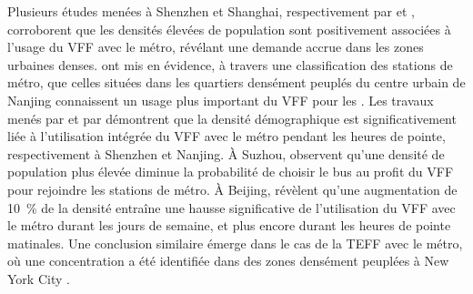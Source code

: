 \begin{refsegment}
Plusieurs études menées à Shenzhen et Shanghai, respectivement par \textcolor{blue}{\textcite[6]{wang_relationship_2020}} et \textcolor{blue}{\textcite[31]{lin_analysis_2019}}, corroborent que les densités élevées de population sont positivement associées à l'usage du \acrshort{VFF} avec le métro, révélant une demande accrue dans les zones urbaines denses. \textcolor{blue}{\textcite[16]{li_operating_2019}} ont mis en évidence, à travers une classification des stations de métro, que celles situées dans les quartiers densément peuplés du centre urbain de Nanjing connaissent un usage plus important du \acrshort{VFF} pour les . Les travaux menés par \textcolor{blue}{\textcite[25]{guo_dockless_2021}} et par \textcolor{blue}{\textcite[184]{cheng_exploring_2022}} démontrent que la densité démographique est significativement liée à l'utilisation intégrée du \acrshort{VFF} avec le métro pendant les heures de pointe, respectivement à Shenzhen et Nanjing. À Suzhou, \textcolor{blue}{\textcite[24]{li_integration_2020}} observent qu'une densité de population plus élevée diminue la probabilité de choisir le bus au profit du \acrshort{VFF} pour rejoindre les stations de métro. À Beijing, \textcolor{blue}{\textcite[11]{liu_temporal_2022}} révèlent qu'une augmentation de 10~\% de la densité entraîne une hausse significative de l'utilisation du \acrshort{VFF} avec le métro durant les jours de semaine, et plus encore durant les heures de pointe matinales. Une conclusion similaire émerge dans le cas de la \acrshort{TEFF} avec le métro, où une concentration a été identifiée dans des zones densément peuplées à New York City \textcolor{blue}{\autocite[16]{lee_forecasting_2021}}.%


\end{refsegment}
